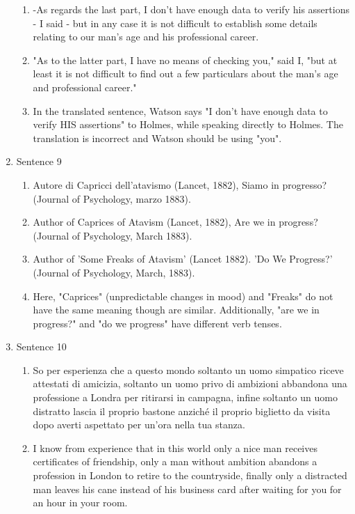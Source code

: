 \documentclass{article}
\begin{document}
\begin{enumerate}
\begin{enumerate}[label=(\alph*)]
        \item -As regards the last part, I don't have enough data to verify his assertions - I said - but in any case it is not difficult to establish some details relating to our man's age and his professional career.
        \item  "As to the latter part, I have no means of checking you," said I, "but at least it is not difficult to find out a few particulars about the man's age and professional career."
        \item In the translated sentence, Watson says "I don't have enough data to verify HIS assertions" to Holmes, while 
            speaking directly to Holmes. The translation is incorrect and Watson should be using "you". 
    \end{enumerate}   
    \item Sentence 9
    \begin{enumerate}[label=(\alph*)]
        \item Autore di Capricci dell'atavismo (Lancet, 1882), Siamo in progresso? (Journal of Psychology, marzo 1883). 
        \item Author of Caprices of Atavism (Lancet, 1882), Are we in progress? (Journal of Psychology, March 1883).
        \item Author of 'Some Freaks of Atavism' (Lancet 1882). 'Do We Progress?' (Journal of Psychology, March, 1883). 
        \item Here, "Caprices" (unpredictable changes in mood) and "Freaks" do not have the same meaning though are similar.
            Additionally, "are we in progress?" and "do we progress" have different verb tenses. 
    \end{enumerate}   
    \item Sentence 10
    \begin{enumerate}[label=(\alph*)]
        \item So per esperienza che a questo mondo soltanto un uomo simpatico riceve attestati di amicizia, soltanto un uomo privo di ambizioni abbandona una professione a Londra per ritirarsi in campagna, infine soltanto un uomo distratto lascia il proprio bastone anziché il proprio biglietto da visita dopo averti aspettato per un'ora nella tua stanza.
        \item I know from experience that in this world only a nice man receives certificates of friendship, only a man without ambition abandons a profession in London to retire to the countryside, finally only a distracted man leaves his cane instead of his business card after waiting for you for an hour in your room.

\end{enumerate}
\end{enumerate}
\end{document}
